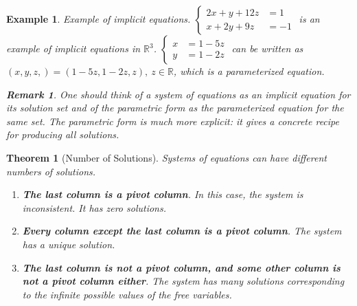 \documentclass[12pt, a4paper]{article}
\newtheorem{thm}{Theorem}[subsection]
\newtheorem{eg}{Example}[subsection]
\newtheorem*{rmk}{\indent Remark}
\def\R{{\mathbb{R}}}
\begin{document}
\begin{eg}
Example of implicit equations.
$\left\{\begin{aligned}2x+y+12z&=1\\x+2y+9z&=-1\end{aligned}\right.$ is an example of implicit equations in $\R^3$. $\left\{\begin{aligned}x&=1-5z\\y&=1-2z\end{aligned}\right.$ can be written as $(x,y,z,)=(1-5z, 1-2z,z),\ z \in \R$, which is a parameterized equation.
\begin{rmk} One should think of a system of equations as an implicit equation for its solution set and of the parametric form as the parameterized equation for the same set. The parametric form is much more explicit: it gives a concrete recipe for producing all solutions.
\end{rmk}
\end{eg}
\begin{thm}[Number of Solutions]
Systems of equations can have different numbers of solutions. 
\begin{enumerate}
\item \textbf{The last column is a pivot column}. In this case, the system is inconsistent. It has zero solutions. 
\item \textbf{Every column except the last column is a pivot column}. The system has a unique solution.
\item \textbf{The last column is not a pivot column, and some other column is not a pivot column either}. The system has many solutions corresponding to the infinite possible values of the free variables.
\end{enumerate}
\end{thm}
\end{document}
